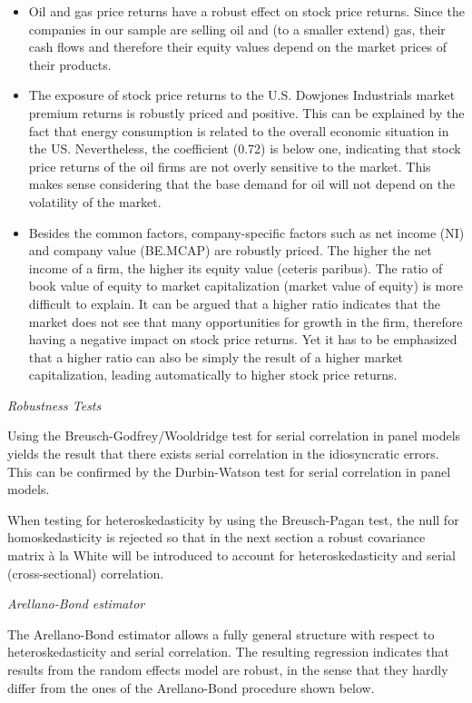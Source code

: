 \documentclass[a4paper]{article}
\begin{document}
\begin{itemize}
\item Oil and gas price returns have a robust effect on stock price returns. Since the companies in our sample are selling oil and (to a smaller extend) gas, their cash flows and therefore their equity values depend on the market prices of their products.

\item The exposure of stock price returns to the U.S. Dowjones Industrials market premium returns is robustly priced and positive. This can be explained by the fact that energy consumption is related to the overall economic situation in the US. Nevertheless, the coefficient (0.72) is below one, indicating that stock price returns of the oil firms are not overly sensitive to the market. This makes sense considering that the base demand for oil will not depend on the volatility of the market. 

\item Besides the common factors, company-specific factors such as net income (NI) and company value (BE.MCAP) are robustly priced. The higher the net income of a firm, the higher its equity value (ceteris paribus). The ratio of book value of equity to market capitalization (market value of equity) is more difficult to explain. It can be argued that a higher ratio indicates that the market does not see that many opportunities for growth in the firm, therefore having a negative impact on stock price returns. Yet it has to be emphasized that a higher ratio can also be simply the result of a higher market capitalization, leading automatically to higher stock price returns.
\end{itemize}

\emph{Robustness Tests}

Using the Breusch-Godfrey/Wooldridge test for serial correlation in panel models yields the result that there exists serial correlation in the idiosyncratic errors. This can be confirmed by the Durbin-Watson test for serial correlation in panel models. 

When testing for heteroskedasticity by using the Breusch-Pagan test, the null for homoskedasticity is rejected so that in the next section a robust covariance matrix à la White will be introduced to account for heteroskedasticity and serial (cross-sectional) correlation. 

\emph{Arellano-Bond estimator}

The Arellano-Bond estimator allows a fully general structure with respect to heteroskedasticity and serial correlation. The resulting regression indicates that results from the random effects model are robust, in the sense that they hardly differ from the ones of the Arellano-Bond procedure shown below.
\end{document}
